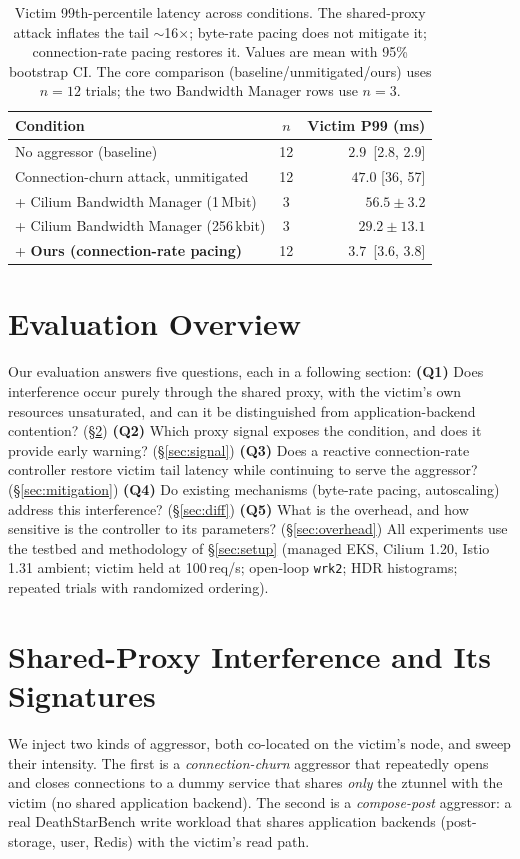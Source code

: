 \documentclass[10pt,twocolumn]{article}
\begin{document}
\begin{table}[t]
\centering
\small
\caption{Victim 99th-percentile latency across conditions. The shared-proxy attack
inflates the tail $\sim$16$\times$; byte-rate pacing does not mitigate it; connection-rate
pacing restores it. Values are mean with 95\% bootstrap CI. The core comparison
(baseline/unmitigated/ours) uses $n{=}12$ trials; the two Bandwidth Manager rows use
$n{=}3$.}
\label{tab:summary}
\begin{tabular}{lcr}
\toprule
Condition & $n$ & Victim P99 (ms) \\
\midrule
No aggressor (baseline)              & 12 & $2.9$ \,[2.8, 2.9] \\
Connection-churn attack, unmitigated & 12 & $47.0$ [36, 57] \\
\;+ Cilium Bandwidth Manager (1\,Mbit)   & 3 & $56.5 \pm 3.2$ \\
\;+ Cilium Bandwidth Manager (256\,kbit) & 3 & $29.2 \pm 13.1$ \\
\;+ \textbf{Ours (connection-rate pacing)} & 12 & $\mathbf{3.7}$ \,[3.6, 3.8] \\
\bottomrule
\end{tabular}
\end{table}

\section{Evaluation Overview}
\label{sec:eval}
Our evaluation answers five questions, each in a following section:
\textbf{(Q1)} Does interference occur purely through the shared proxy, with the victim's own
resources unsaturated, and can it be distinguished from application-backend contention?
(\S\ref{sec:char})
\textbf{(Q2)} Which proxy signal exposes the condition, and does it provide early warning?
(\S\ref{sec:signal})
\textbf{(Q3)} Does a reactive connection-rate controller restore victim tail latency while
continuing to serve the aggressor? (\S\ref{sec:mitigation})
\textbf{(Q4)} Do existing mechanisms (byte-rate pacing, autoscaling) address this
interference? (\S\ref{sec:diff})
\textbf{(Q5)} What is the overhead, and how sensitive is the controller to its parameters?
(\S\ref{sec:overhead})
All experiments use the testbed and methodology of \S\ref{sec:setup} (managed EKS, Cilium
1.20, Istio 1.31 ambient; victim held at 100\,req/s; open-loop \texttt{wrk2}; HDR
histograms; repeated trials with randomized ordering).

\section{Shared-Proxy Interference and Its Signatures}
\label{sec:char}
We inject two kinds of aggressor, both co-located on the victim's node, and sweep their
intensity. The first is a \emph{connection-churn} aggressor that repeatedly opens and
closes connections to a dummy service that shares \emph{only} the ztunnel with the victim
(no shared application backend). The second is a \emph{compose-post} aggressor: a real
DeathStarBench write workload that shares application backends (post-storage, user,
Redis) with the victim's read path.
\end{document}

